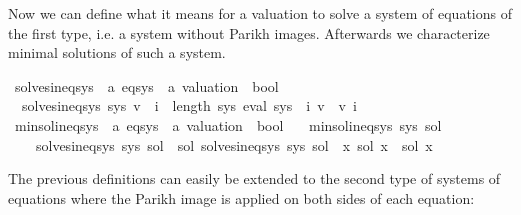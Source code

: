 \begin{isabellebody}
\begin{isamarkuptext}%
Now we can define what it means for a valuation  to solve a system of equations of the
first type, i.e. a system without Parikh images. Afterwards we characterize minimal solutions of
such a system.%
\end{isamarkuptext}\isamarkuptrue%
\isamarkupfalse%
\ solves{\isacharunderscore}{\kern0pt}ineq{\isacharunderscore}{\kern0pt}sys\ {\isacharcolon}{\kern0pt}{\isacharcolon}{\kern0pt}\ {\isachardoublequoteopen}{\isacharprime}{\kern0pt}a\ eq{\isacharunderscore}{\kern0pt}sys\ {\isasymRightarrow}\ {\isacharprime}{\kern0pt}a\ valuation\ {\isasymRightarrow}\ bool{\isachardoublequoteclose}\ \isanewline
\ \ {\isachardoublequoteopen}solves{\isacharunderscore}{\kern0pt}ineq{\isacharunderscore}{\kern0pt}sys\ sys\ v\ {\isasymequiv}\ {\isasymforall}i\ {\isacharless}{\kern0pt}\ length\ sys{\isachardot}{\kern0pt}\ eval\ {\isacharparenleft}{\kern0pt}sys\ {\isacharbang}{\kern0pt}\ i{\isacharparenright}{\kern0pt}\ v\ {\isasymsubseteq}\ v\ i{\isachardoublequoteclose}\isanewline
\isanewline
{}\isamarkupfalse%
\ min{\isacharunderscore}{\kern0pt}sol{\isacharunderscore}{\kern0pt}ineq{\isacharunderscore}{\kern0pt}sys\ {\isacharcolon}{\kern0pt}{\isacharcolon}{\kern0pt}\ {\isachardoublequoteopen}{\isacharprime}{\kern0pt}a\ eq{\isacharunderscore}{\kern0pt}sys\ {\isasymRightarrow}\ {\isacharprime}{\kern0pt}a\ valuation\ {\isasymRightarrow}\ bool{\isachardoublequoteclose}\ \isanewline
\ \ {\isachardoublequoteopen}min{\isacharunderscore}{\kern0pt}sol{\isacharunderscore}{\kern0pt}ineq{\isacharunderscore}{\kern0pt}sys\ sys\ sol\ {\isasymequiv}\isanewline
\ \ \ \ solves{\isacharunderscore}{\kern0pt}ineq{\isacharunderscore}{\kern0pt}sys\ sys\ sol\ {\isasymand}\ {\isacharparenleft}{\kern0pt}{\isasymforall}sol{\isacharprime}{\kern0pt}{\isachardot}{\kern0pt}\ solves{\isacharunderscore}{\kern0pt}ineq{\isacharunderscore}{\kern0pt}sys\ sys\ sol{\isacharprime}{\kern0pt}\ {\isasymlongrightarrow}\ {\isacharparenleft}{\kern0pt}{\isasymforall}x{\isachardot}{\kern0pt}\ sol\ x\ {\isasymsubseteq}\ sol{\isacharprime}{\kern0pt}\ x{\isacharparenright}{\kern0pt}{\isacharparenright}{\kern0pt}{\isachardoublequoteclose}%
\begin{isamarkuptext}%
The previous definitions can easily be extended to the second type of systems of equations
where the Parikh image is applied on both sides of each equation:%
\end{isamarkuptext}\isamarkuptrue%
\isamarkupfalse%

\end{isabellebody}

